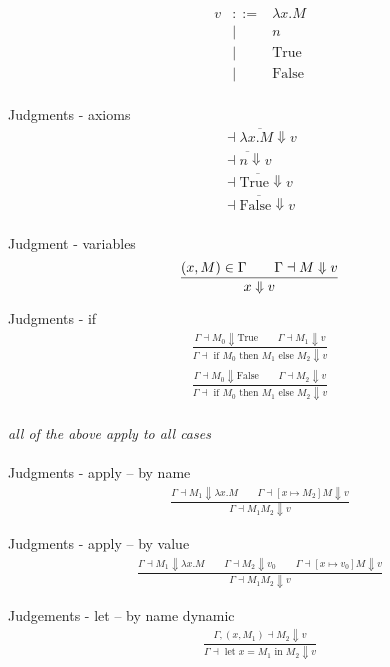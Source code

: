 \documentclass[12pt,letterpaper]{article}
\newcommand{\ifst}[3]{\text{ if } #1 \text{ then } #2 \text{ else } #3}
\newcommand{\lets}[2]{\text{ let }x=#1\text{ in }#2}
\newcommand{\true}{\text{True}}
\newcommand{\false}{\text{False}}
\begin{document}
\begin{eqnarray*}
v & ::= & \lambda x.M \\
&|& n \\
&|& \true \\
&|& \false \\
\end{eqnarray*}

Judgments - axioms
\begin{eqnarray*}
\overline{\dashv \lambda x.M \Downarrow v} \\
\overline{\dashv n \Downarrow v} \\
\overline{\dashv \true \Downarrow v} \\
\overline{\dashv \false  \Downarrow v} \\
\end{eqnarray*}

Judgment - variables
\begin{eqnarray*}
{{(x,M)\in\Gamma \qquad \Gamma \dashv M \Downarrow v}\over{x \Downarrow v}}
\end{eqnarray*}

Judgments - if
\begin{eqnarray*}
\frac{\Gamma \dashv M_0 \Downarrow \true \qquad \Gamma \dashv M_1 \Downarrow v}{\Gamma \dashv \ifst{M_0}{M_1}{M_2} \Downarrow v} \\
\frac{\Gamma \dashv M_0 \Downarrow \false \qquad \Gamma \dashv M_2 \Downarrow v}{\Gamma \dashv \ifst{M_0}{M_1}{M_2} \Downarrow v} \\
\end{eqnarray*}

{\it all of the above apply to all cases}\\ \\

Judgments - apply -- by name
\begin{eqnarray*}
\frac{\Gamma \dashv M_1 \Downarrow \lambda x.M \qquad \Gamma \dashv [x \mapsto M_2]M \Downarrow v}{\Gamma \dashv M_1 M_2 \Downarrow v}
\end{eqnarray*}

Judgments - apply -- by value
\begin{eqnarray*}
\frac{\Gamma \dashv M_1 \Downarrow \lambda x.M \qquad \Gamma \dashv M_2 \Downarrow v_0 \qquad\Gamma \dashv [x \mapsto v_0]M \Downarrow v}{\Gamma \dashv M_1 M_2 \Downarrow v}
\end{eqnarray*}

Judgements - let -- by name dynamic
\begin{eqnarray*}
\frac{\Gamma,(x,M_1) \dashv M_2 \Downarrow v}{\Gamma \dashv \lets{M_1}{M_2} \Downarrow v}
\end{eqnarray*}
\end{document}
